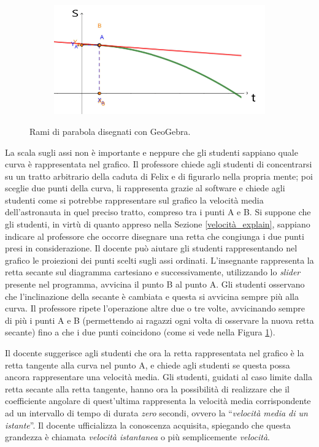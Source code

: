 \documentclass{report} \usepackage[T1]{fontenc} \usepackage[italian]{babel}
\begin{document}
\begin{figure}[H]
\begin{subfigure}[b]{0.49\textwidth}
  \end{subfigure}
  \begin{subfigure}[b]{0.49\textwidth}
  \includegraphics[width=\textwidth]{tg4}
  \end{subfigure}
  \caption{
           Rami di parabola  disegnati con GeoGebra.
          }
  \label{fig:geogebra}
\end{figure}
La scala sugli assi non è importante e neppure che gli studenti sappiano quale
curva è rappresentata nel grafico.
Il professore chiede agli studenti di concentrarsi su un tratto arbitrario della
caduta di Felix e di figurarlo nella propria mente; poi sceglie due punti
della curva, li rappresenta grazie al software e chiede agli studenti
come si potrebbe rappresentare sul grafico la velocità media dell'astronauta
in quel preciso tratto, compreso tra i punti A e B.
Si suppone che gli studenti, in virtù di quanto appreso
nella Sezione \ref{velocità_explain}, sappiano indicare al professore che
occorre
disegnare una retta che congiunga i due punti presi in considerazione.
Il docente può aiutare gli studenti rappresentando nel grafico le proiezioni
dei punti scelti sugli assi ordinati.
L'insegnante rappresenta la retta secante sul diagramma cartesiano e
successivamente, utilizzando lo \emph{slider} presente nel programma,
avvicina il punto B al punto A. Gli studenti osservano che l'inclinazione
della secante è cambiata e questa si avvicina sempre più alla curva.
Il professore ripete l'operazione altre due o
tre volte, avvicinando sempre di più i punti A e B (permettendo ai ragazzi
ogni volta di osservare la nuova retta secante) fino a che i due punti
coincidono (come si vede nella Figura \ref{fig:geogebra}).

Il docente suggerisce agli studenti che ora la retta rappresentata nel grafico
è la retta tangente alla curva nel punto A, e chiede agli studenti se questa possa
ancora rappresentare una velocità media. Gli studenti, guidati al caso limite dalla retta
secante alla retta tangente, hanno ora la possibilità di realizzare che il coefficiente
angolare di quest'ultima rappresenta la velocità media corrispondente ad un intervallo
di tempo di durata \emph{zero} secondi, ovvero la ``\emph{velocità media di un istante}''.
Il docente ufficializza la conoscenza acquisita, spiegando che questa grandezza è
chiamata \emph{velocità istantanea} o più semplicemente \emph{velocità}.
\end{document}
